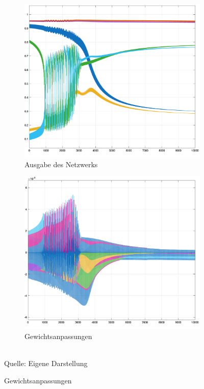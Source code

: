 \begin{figure}[h]
  \caption{Simulationen des \ac{c-ep} mit 6 Neuronen}
  \centering
  \begin{subfigure}[b]{0.5\textwidth}
    \includegraphics[width=\textwidth]{abbildungen/c_ep_sim_3_ausgabe.png}
    \caption{Ausgabe des Netzwerks}
  \end{subfigure}%
  \hfill
  \begin{subfigure}[b]{0.5\textwidth}
    \includegraphics[width=\textwidth]{abbildungen/c_ep_sim_3_weight_update.png}
    \caption{Gewichtsanpassungen}
  \end{subfigure}
  \\
  Quelle: Eigene Darstellung
  \label{fig:C-EP Sim 3}
\end{figure}
